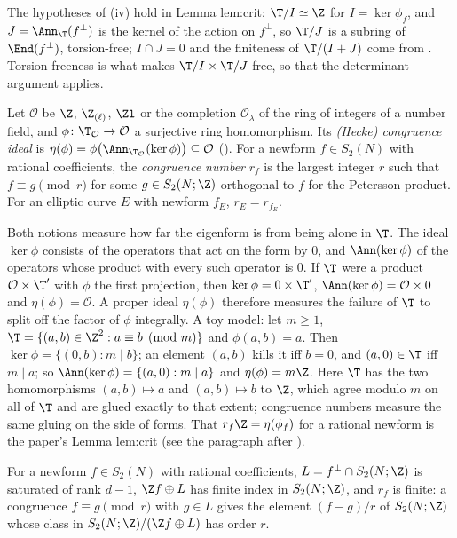 The hypotheses of (iv) hold in Lemma lem:crit: $\T/I\simeq\Z$ for $I=\ker\phi_f$, and $J=\Ann_\T(f^\perp)$ is the kernel of the action on $f^\perp$, so $\T/J$ is a subring of $\End(f^\perp)$,
torsion-free; $I\cap J=0$ and the finiteness of $\T/(I+J)$ come from . Torsion-freeness is what makes $\T/I\times\T/J$ free, so that the
determinant argument applies.

\begin{definition}\label{def:hecke:congruence-ideal}
Let $\mathcal O$ be $\Z$, $\Z_{(\ell)}$, $\Zl$ or the completion $\mathcal O_\lambda$ of the ring of integers of a number field, and $\phi\colon\T_{\mathcal O}\to\mathcal O$ a surjective ring homomorphism. Its
\emph{(Hecke) congruence ideal} is $\eta(\phi)=\phi\bigl(\Ann_{\T_{\mathcal O}}(\ker\phi)\bigr)\subseteq\mathcal O$ (). For a newform $f\in S_2(N)$ with rational coefficients, the
\emph{congruence number} $r_f$ is the largest integer $r$ such that $f\equiv g\pmod r$ for some $g\in S_2(N;\Z)$ orthogonal to $f$ for the Petersson product. For an elliptic curve
$E$ with newform $f_E$, $r_E=r_{f_E}$.
\end{definition}

Both notions measure how far the eigenform is from being alone in $\T$. The ideal $\ker\phi$ consists of the operators that act on the form by $0$, and $\Ann(\ker\phi)$ of
the operators whose product with every such operator is $0$. If $\T$ were a product $\mathcal O\times\T'$ with $\phi$ the first projection, then $\ker\phi=0\times\T'$,
$\Ann(\ker\phi)=\mathcal O\times0$ and $\eta(\phi)=\mathcal O$. A proper ideal $\eta(\phi)$ therefore measures the failure of $\T$ to split off the factor of $\phi$ integrally. A toy
model: let $m\ge1$, $\T=\{(a,b)\in\Z^2:a\equiv b\pmod m\}$ and $\phi(a,b)=a$. Then $\ker\phi=\{(0,b):m\mid b\}$; an element $(a,b)$ kills it iff $b=0$, and $(a,0)\in\T$ iff $m\mid a$; so
$\Ann(\ker\phi)=\{(a,0):m\mid a\}$ and $\eta(\phi)=m\Z$. Here $\T$ has the two homomorphisms $(a,b)\mapsto a$ and $(a,b)\mapsto b$ to $\Z$, which agree modulo $m$ on all of $\T$ and are
glued exactly to that extent; congruence numbers measure the same gluing on the side of forms. That $r_f\Z=\eta(\phi_f)$ for a rational newform is the paper's Lemma lem:crit (see
the paragraph after ).

\begin{proposition}\label{prop:hecke:rf-finite}
For a newform $f\in S_2(N)$ with rational coefficients, $L=f^\perp\cap S_2(N;\Z)$ is saturated of rank $d-1$, $\Z f\oplus L$ has finite index in $S_2(N;\Z)$, and $r_f$ is finite: a
congruence $f\equiv g\pmod r$ with $g\in L$ gives the element $(f-g)/r$ of $S_2(N;\Z)$ whose class in $S_2(N;\Z)/(\Z f\oplus L)$ has order $r$.
\end{proposition}

